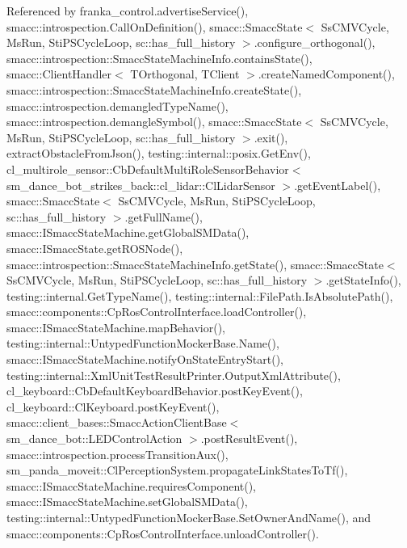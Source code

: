 Referenced by franka\+\_\+control.\+advertise\+Service(), smacc\+::introspection.\+Call\+On\+Definition(), smacc\+::\+Smacc\+State$<$ Ss\+C\+M\+V\+Cycle, Ms\+Run, Sti\+P\+S\+Cycle\+Loop, sc\+::has\+\_\+full\+\_\+history $>$.\+configure\+\_\+orthogonal(), smacc\+::introspection\+::\+Smacc\+State\+Machine\+Info.\+contains\+State(), smacc\+::\+Client\+Handler$<$ T\+Orthogonal, T\+Client $>$.\+create\+Named\+Component(), smacc\+::introspection\+::\+Smacc\+State\+Machine\+Info.\+create\+State(), smacc\+::introspection.\+demangled\+Type\+Name(), smacc\+::introspection.\+demangle\+Symbol(), smacc\+::\+Smacc\+State$<$ Ss\+C\+M\+V\+Cycle, Ms\+Run, Sti\+P\+S\+Cycle\+Loop, sc\+::has\+\_\+full\+\_\+history $>$.\+exit(), extract\+Obstacle\+From\+Json(), testing\+::internal\+::posix.\+Get\+Env(), cl\+\_\+multirole\+\_\+sensor\+::\+Cb\+Default\+Multi\+Role\+Sensor\+Behavior$<$ sm\+\_\+dance\+\_\+bot\+\_\+strikes\+\_\+back\+::cl\+\_\+lidar\+::\+Cl\+Lidar\+Sensor $>$.\+get\+Event\+Label(), smacc\+::\+Smacc\+State$<$ Ss\+C\+M\+V\+Cycle, Ms\+Run, Sti\+P\+S\+Cycle\+Loop, sc\+::has\+\_\+full\+\_\+history $>$.\+get\+Full\+Name(), smacc\+::\+I\+Smacc\+State\+Machine.\+get\+Global\+S\+M\+Data(), smacc\+::\+I\+Smacc\+State.\+get\+R\+O\+S\+Node(), smacc\+::introspection\+::\+Smacc\+State\+Machine\+Info.\+get\+State(), smacc\+::\+Smacc\+State$<$ Ss\+C\+M\+V\+Cycle, Ms\+Run, Sti\+P\+S\+Cycle\+Loop, sc\+::has\+\_\+full\+\_\+history $>$.\+get\+State\+Info(), testing\+::internal.\+Get\+Type\+Name(), testing\+::internal\+::\+File\+Path.\+Is\+Absolute\+Path(), smacc\+::components\+::\+Cp\+Ros\+Control\+Interface.\+load\+Controller(), smacc\+::\+I\+Smacc\+State\+Machine.\+map\+Behavior(), testing\+::internal\+::\+Untyped\+Function\+Mocker\+Base.\+Name(), smacc\+::\+I\+Smacc\+State\+Machine.\+notify\+On\+State\+Entry\+Start(), testing\+::internal\+::\+Xml\+Unit\+Test\+Result\+Printer.\+Output\+Xml\+Attribute(), cl\+\_\+keyboard\+::\+Cb\+Default\+Keyboard\+Behavior.\+post\+Key\+Event(), cl\+\_\+keyboard\+::\+Cl\+Keyboard.\+post\+Key\+Event(), smacc\+::client\+\_\+bases\+::\+Smacc\+Action\+Client\+Base$<$ sm\+\_\+dance\+\_\+bot\+::\+L\+E\+D\+Control\+Action $>$.\+post\+Result\+Event(), smacc\+::introspection.\+process\+Transition\+Aux(), sm\+\_\+panda\+\_\+moveit\+::\+Cl\+Perception\+System.\+propagate\+Link\+States\+To\+Tf(), smacc\+::\+I\+Smacc\+State\+Machine.\+requires\+Component(), smacc\+::\+I\+Smacc\+State\+Machine.\+set\+Global\+S\+M\+Data(), testing\+::internal\+::\+Untyped\+Function\+Mocker\+Base.\+Set\+Owner\+And\+Name(), and smacc\+::components\+::\+Cp\+Ros\+Control\+Interface.\+unload\+Controller().

